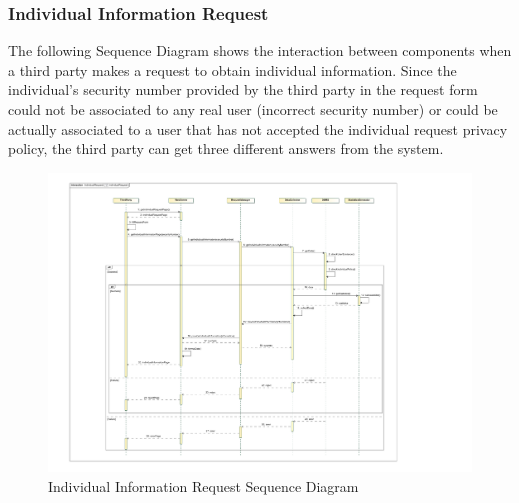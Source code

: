 \subsubsection{Individual Information Request}
The following Sequence Diagram shows the interaction between components when a third party makes a request to obtain individual information. Since the individual's security number provided by the third party in the request form could not be associated to any real user (incorrect security number) or could be actually associated to a user that has not accepted the individual request privacy policy, the third party can get three different answers from the system.
\\[1.0cm]
\begin{figure}[H]
\centering
\includegraphics[scale=0.8, angle=0,origin=c]{Images/SequenceDiagrams/IndividualRequest.pdf}
\caption{Individual Information Request Sequence Diagram}
\clearpage
\end{figure}
\newpage
